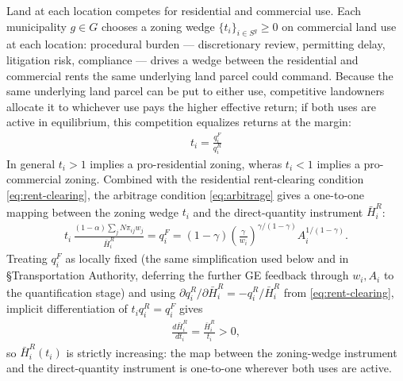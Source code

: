 \documentclass[12pt, a4paper]{article}
\theoremstyle{definition}
\theoremstyle{remark}
\begin{document}
Land at each location competes for residential and commercial use. Each municipality $g \in G$ chooses a zoning wedge $\{t_i\}_{i \in S^g} \geq 0$ on commercial land use at each location: procedural burden — discretionary review, permitting delay, litigation risk, compliance — drives a wedge between the residential and commercial rents the same underlying land parcel could command. Because the same underlying land parcel can be put to either use, competitive landowners allocate it to whichever use pays the higher effective return; if both uses are active in equilibrium, this competition equalizes returns at the margin:
\begin{align}
    \label{eq:arbitrage}
    t_{i}=\frac{q_{i}^{F}}{q_{i}^{R}}
\end{align}
In general $t_{i}>1$ implies a pro-residential zoning, wheras $t_{i}<1$ implies a pro-commercial zoning. Combined with the residential rent-clearing condition \eqref{eq:rent-clearing}, the arbitrage condition \eqref{eq:arbitrage} gives a one-to-one mapping between the zoning wedge $t_i$ and the direct-quantity instrument $\bar H_i^R$:
\begin{align}
    \label{eq:arbitrage1}
    t_i\,\frac{(1-\alpha)\sum_j N\pi_{ij}w_j}{\bar H_i^R} = q_i^F=(1-\gamma)\left(\frac{\gamma}{w_{i}}\right)^{\gamma/(1-\gamma)}A_{i}^{1/(1-\gamma)}.
\end{align}
Treating $q_i^F$ as locally fixed (the same simplification used below and in \S Transportation Authority, deferring the further GE feedback through $w_i,A_i$ to the quantification stage) and using $\partial q_i^R/\partial \bar H_i^R=-q_i^R/\bar H_i^R$ from \eqref{eq:rent-clearing}, implicit differentiation of $t_i q_i^R=q_i^F$ gives
\begin{align}
    \label{zoning-foc-tax}
    \frac{d\bar H_i^R}{dt_i} = \frac{\bar H_i^R}{t_i} > 0,
\end{align}
so $\bar H_i^R(t_i)$ is strictly increasing: the map between the zoning-wedge instrument and the direct-quantity instrument is one-to-one wherever both uses are active.
\end{document}
